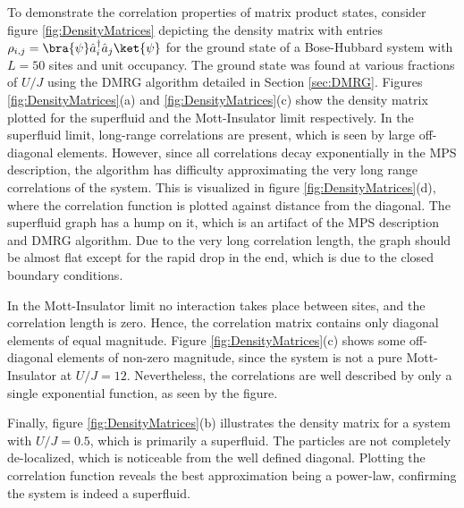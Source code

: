 To demonstrate the correlation properties of matrix product states, consider figure \ref{fig:DensityMatrices} depicting the density matrix with entries $\rho_{i,j} = \bra{\psi} \hat{a}_{i}^{\dag} \hat{a}_{j} \ket{\psi}$ for the ground state of a Bose-Hubbard system with $L = 50$ sites and unit occupancy. The ground state was found at various fractions of $U/J$ using the DMRG algorithm detailed in Section \ref{sec:DMRG}.
Figures \ref{fig:DensityMatrices}(a) and \ref{fig:DensityMatrices}(c) show the density matrix plotted for the superfluid and the Mott-Insulator limit respectively. In the superfluid limit, long-range correlations are present, which is seen by large off-diagonal elements. However, since all correlations decay exponentially in the MPS description, the algorithm has difficulty approximating the very long range correlations of the system. This is visualized in figure \ref{fig:DensityMatrices}(d), where the correlation function is plotted against distance from the diagonal. The superfluid graph has a hump on it, which is an artifact of the MPS description and DMRG algorithm. Due to the very long correlation length, the graph should be almost flat except for the rapid drop in the end, which is due to the closed boundary conditions.

In the Mott-Insulator limit no interaction takes place between sites, and the correlation length is zero. Hence, the correlation matrix contains only diagonal elements of equal magnitude. Figure \ref{fig:DensityMatrices}(c) shows some off-diagonal elements of non-zero magnitude, since the system is not a pure Mott-Insulator at $U/J = 12$. Nevertheless, the correlations are well described by only a single exponential function, as seen by the figure.

Finally, figure \ref{fig:DensityMatrices}(b) illustrates the density matrix for a system with $U/J = 0.5$, which is primarily a superfluid. The particles are not completely de-localized, which is noticeable from the well defined diagonal. Plotting the correlation function reveals the best approximation being a power-law, confirming the system is indeed a superfluid. 
